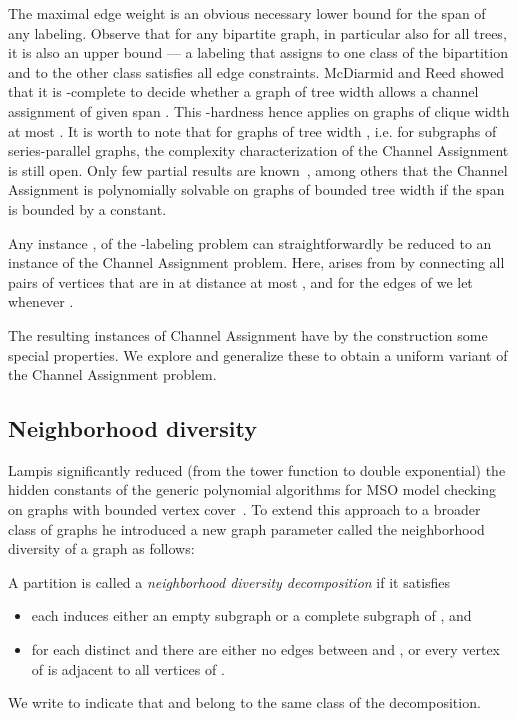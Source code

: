 \documentclass[a4paper,UKenglish]{lipics}
\newcommand{\NP}{{\sf{NP}}\xspace}
\theoremstyle{plain}
\theoremstyle{definition}
\begin{document}
{The maximal edge weight is an obvious necessary lower bound for the span of any labeling. 
Observe that for any bipartite graph, in particular also for all trees, it is also an upper bound 
--- a labeling that assigns  to one class of the bipartition and  to the other class
satisfies all edge constraints. 
McDiarmid and Reed \cite{c:DR03} showed that it is \NP-complete to decide whether a graph of tree width  
allows a channel assignment of given span .
This \NP-hardness hence applies on graphs of clique width at most .
It is worth to note that for graphs of tree width , i.e. for subgraphs of series-parallel graphs,
the complexity characterization of the {\sc Channel Assignment} is still open. Only few partial results are known~\cite{c:Skvarek10},
among others that the {\sc Channel Assignment} is polynomially solvable on graphs of bounded tree width if the span  is bounded by a constant.

Any instance ,  of the {\sc -labeling} problem can straightforwardly be reduced to an instance  of the {\sc Channel Assignment} problem.
Here,  arises from  by connecting all pairs of vertices that are in  at distance at most , and for the edges of 
we let  whenever .

The resulting instances of {\sc Channel Assignment} have by the construction some special properties. We explore and generalize these to obtain a uniform variant of the {\sc Channel Assignment} problem.

\subsection{Neighborhood diversity}


Lampis significantly reduced (from the tower function to double exponential) the hidden constants of the generic polynomial algorithms for MSO model checking on graphs with bounded vertex cover~\cite{t:Lampis12}.
To extend this approach to a broader class of graphs he introduced a new graph parameter called the neighborhood diversity of a graph as follows:

\begin{definition}
A partition  is called a \emph{neighborhood diversity decomposition} if it satisfies
\begin{itemize}
\item each  induces either an empty subgraph or a complete subgraph of , and
\item for each distinct  and  there are either no edges between  and , or every vertex of  is adjacent to all vertices of .
\end{itemize}
We write  to indicate that  and  belong to the same class of the decomposition.


\end{definition}}
\end{document}
